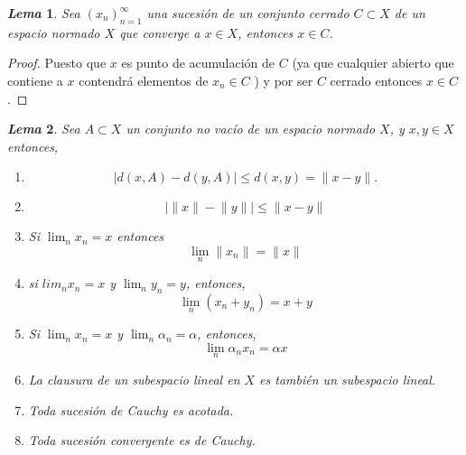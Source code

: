 \documentclass[12pt]{book}
\newtheorem{lema}{\it Lema}[chapter]
\begin{document}
 \begin{lema}  Sea $(x_n)_{n=1}^\infty$ una sucesión de un conjunto  cerrado $C\subset X$ de un 
espacio normado $X$ que converge a $x\in X$, entonces  $x\in C$.
 \end{lema}
  \begin{proof}
   
    Puesto que $x$ es punto de acumulación de $C$ (ya que cualquier  abierto que contiene a $x$ 
contendrá elementos de $x_n\in C$ ) y por ser $C$ cerrado entonces $x\in C$.
    \end{proof}
\begin{lema} Sea $A\subset X$ un conjunto  no vacío  de un espacio normado $X$, y $x,y\in X$  
entonces,
\begin{enumerate}
\item
$$\lvert d(x,A)-d(y,A)\rvert \leq d(x,y)=\lVert x-y\rVert.$$
\item 
$$\lvert \lVert x\rVert-\lVert y\rVert\rvert\leq\lVert x-y\rVert$$
\item Si  $\lim_n x_n=x$ entonces 
 $$\lim_n\lVert x_n\rVert=\lVert x\rVert$$
 \item si $lim_n x_n=x$ y $\lim_n y_n =y$, entonces,
 $$\lim_n (x_n+y_n)=x+y$$
 
 \item Si $\lim_n x_n=x$ y $\lim_n \alpha_n =\alpha$,  entonces,
  $$\lim_n\alpha_nx_n=\alpha x$$
  \item La clausura de un subespacio lineal en $X$ es también un  subespacio lineal.
  
  \item Toda sucesión de Cauchy es acotada.
  \item Toda sucesión convergente es de Cauchy.
  \end{enumerate}
  \end{lema}
\end{document}
